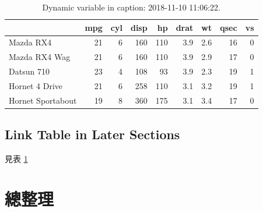 \documentclass[oneside]{book}
\theoremstyle{definition}
\theoremstyle{definition}
\theoremstyle{definition}
\theoremstyle{remark}
\begin{document}
\begin{table}[t]

\caption{\label{tab:mtcar}Dynamic variable in caption: 2018-11-10 11:06:22.}
\centering
\begin{tabular}{lrrrrrrrr}
\toprule
  & mpg & cyl & disp & hp & drat & wt & qsec & vs\\
\midrule
Mazda RX4 & 21 & 6 & 160 & 110 & 3.9 & 2.6 & 16 & 0\\
Mazda RX4 Wag & 21 & 6 & 160 & 110 & 3.9 & 2.9 & 17 & 0\\
Datsun 710 & 23 & 4 & 108 & 93 & 3.9 & 2.3 & 19 & 1\\
Hornet 4 Drive & 21 & 6 & 258 & 110 & 3.1 & 3.2 & 19 & 1\\
Hornet Sportabout & 19 & 8 & 360 & 175 & 3.1 & 3.4 & 17 & 0\\
\bottomrule
\end{tabular}
\end{table}

\subsection*{Link Table in Later
Sections}\label{link-table-in-later-sections}

見表 \ref{tab:mtcar}

\section{總整理}
\end{document}
